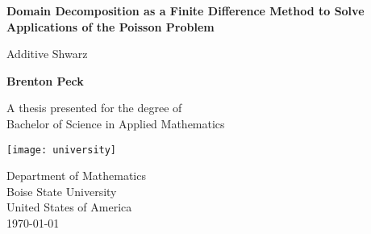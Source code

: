 \begin{titlepage}
    \begin{center}
        \vspace*{1cm}
        
	\Huge
        \textbf{Domain Decomposition as a Finite Difference Method to Solve Applications of the Poisson Problem}
        
        \vspace{0.5cm}
	\LARGE
        Additive Shwarz
        
        \vspace{1.5cm}
        
        \textbf{Brenton Peck}
        
        \vfill
        
        A thesis presented for the degree of\\
        Bachelor of Science in Applied Mathematics
        
        \vspace{0.8cm}
        
        \texttt{[image: university]}
        
	\Large
        Department of Mathematics\\
        Boise State University\\
        United States of America\\
        \today
        
    \end{center}
\end{titlepage}